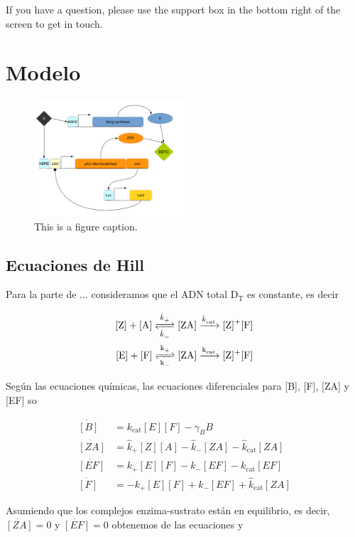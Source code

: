 \documentclass[12pt]{article}
\begin{document}
If you have a question, please use the support box in the bottom right of the screen to get in touch. 

\section{Modelo}
\label{sec:model}

\begin{figure}
\centering
\includegraphics[width=0.5\textwidth]{circuit.png}
\caption{\label{fig:Circuit}This is a figure caption.}
\end{figure}

\subsection{Ecuaciones de Hill}

Para la parte de ... consideramos que el ADN total $\text{D}_{\text{T}}$ es constante, es decir

\begin{align}
\ce{[Z] + [A] <=>[\ce{\hat{k}_+}][\ce{\hat{k}_-}] [ZA] ->[\ce{\hat{k}_{cat}}] [Z]+[F]}\\
\ce{[E] + [F] <=>[\ce{k_+}][\ce{k_-}] [ZA] ->[\ce{k_{cat}}] [Z]+[F]}
\end{align}

Seg\'un las ecuaciones qu\'imicas, las ecuaciones diferenciales para [B], [F], [ZA] y [EF] so

\begin{align}
  \dot{[B]} &= k_{\text{cat}}[E][F]-\gamma_BB \label{eq:Bdot}\\
  \dot{[ZA]} &= \hat{k}_+[Z][A] - \hat{k}_-[ZA]-\hat{k}_{\text{cat}}[ZA] \label{eq:ZAdot}\\
  \dot{[EF]} &= k_+[E][F]-k_-[EF]-k_{\text{cat}}[EF] \label{eq:EFdot}\\
  \dot{[F]} &= -k_+[E][F]+k_-[EF]+\hat{k}_{\text{cat}}[ZA] \label{eq:Fdot}
\end{align}

Asumiendo que los complejos enzima-sustrato est\'an en equilibrio, es decir, $\dot{[ZA]} = 0$ y $\dot{[EF]} = 0$ obtenemos de las ecuaciones \cite{eq:ZAdot} y \cite{eq:EFdot}
\end{document}
